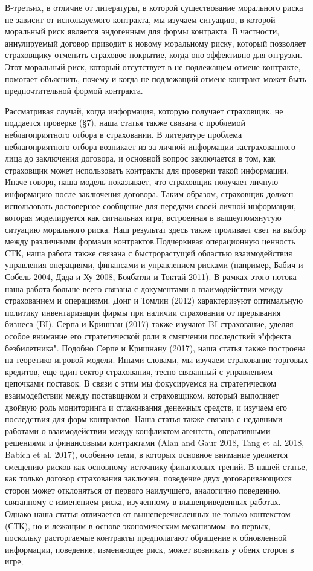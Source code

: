 \documentclass[a4paper,12pt]{article}
\begin{document}
В-третьих, в отличие от литературы, в которой существование морального риска не зависит от используемого контракта, мы изучаем ситуацию, в которой моральный риск является эндогенным для формы контракта. В частности, аннулируемый договор приводит к новому моральному риску, который позволяет страховщику отменить страховое покрытие, когда оно эффективно для отгрузки. Этот моральный риск, который отсутствует в не подлежащем отмене контракте, помогает объяснить, почему и когда не подлежащий отмене контракт может быть предпочтительной формой контракта.

Рассматривая случай, когда информация, которую получает страховщик, не поддается проверке (§7), наша статья также связана с проблемой неблагоприятного отбора в страховании. В литературе проблема неблагоприятного отбора возникает из-за личной информации застрахованного лица до заключения договора, и основной вопрос заключается в том, как страховщик может использовать контракты для проверки такой информации. Иначе говоря, наша модель показывает, что страховщик получает личную информацию после заключения договора. Таким образом, страховщик должен использовать достоверное сообщение для передачи своей личной информации, которая моделируется как сигнальная игра, встроенная в вышеупомянутую ситуацию морального риска. Наш результат здесь также проливает свет на выбор между различными формами контрактов.Подчеркивая операционную ценность СТК, наша работа также связана с быстрорастущей областью взаимодействия управления операциями, финансами и управлением рисками (например, Бабич и Собель 2004, Дада и Ху 2008, Боябатли и Токтай 2011). В рамках этого потока наша работа больше всего связана с документами о взаимодействии между страхованием и операциями. Донг и Томлин (2012) характеризуют оптимальную политику инвентаризации фирмы при наличии страхования от прерывания бизнеса (BI). Серпа и Кришнан (2017) также изучают BI-страхование, уделяя особое внимание его стратегической роли в смягчении последствий э"ффекта безбилетника". Подобно Серпе и Кришнану (2017), наша статья также построена на теоретико-игровой модели. Иными словами, мы изучаем страхование торговых кредитов, еще один сектор страхования, тесно связанный с управлением цепочками поставок. В связи с этим мы фокусируемся на стратегическом взаимодействии между поставщиком и страховщиком, который выполняет двойную роль мониторинга и сглаживания денежных средств, и изучаем его последствия для форм контрактов. Наша статья также связана с недавними работами о взаимодействии между конфликтом агентств, оперативными решениями и финансовыми контрактами (Alan and Gaur 2018, Tang et al. 2018, Babich et al. 2017), особенно теми, в которых основное внимание уделяется смещению рисков как основному источнику финансовых трений. В нашей статье, как только договор страхования заключен, поведение двух договаривающихся сторон может отклоняться от первого наилучшего, аналогично поведению, связанному с изменением риска, изученному в вышеприведенных работах. Однако наша статья отличается от вышеперечисленных не только контекстом (СТК), но и лежащим в основе экономическим механизмом: во-первых, поскольку расторгаемые контракты предполагают обращение к обновленной информации, поведение, изменяющее риск, может возникать у обеих сторон в игре; 
\end{document}
